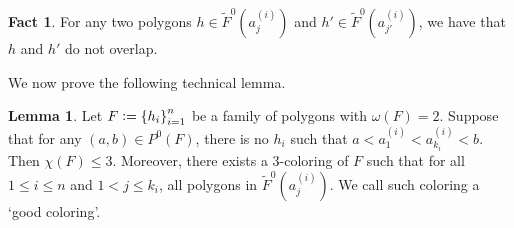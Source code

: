 \documentclass[12pt]{article}
\theoremstyle{definition}
\newtheorem{lemma}[thm]{Lemma}
\newtheorem{fact}[thm]{Fact}
\newcommand{\defeq}{\vcentcolon=}
\begin{document}
     \begin{fact}
         For any two polygons
         $h \in \widetilde{F}^{0}\left(a_{j}^{\left(i\right)}\right)$ 
         and 
         $h' \in \widetilde{F}^{0}\left(a_{j'}^{\left(i\right)}\right)$, 
         we have that $h$ and $h'$
         do not overlap.    
     \end{fact}

     We now prove the following
     technical lemma.

     \begin{lemma} \label{lemma:poly}
         Let $F \defeq \left\{h_{i}\right\}_{i =1}^{n}$ 
         be a family of polygons with
         $\omega\left(F\right) = 2$.
         Suppose that for any
         $\left(a, b\right) \in P^{0}\left(F\right)$,
         there is no $h_{i}$ such
         that $a < a_1^{\left(i\right)}
         < a_{k_{i}}^{\left(i\right)} < b$.
         Then $\chi\left(F\right) \leq 3$.
         Moreover, there exists
         a 3-coloring of $F$ such
         that for all $1 \leq i \leq n$
         and $1 < j \leq k_{i}$,
         all polygons in
         $\widetilde{F}^{0}\left(a_{j}^{\left(i\right)}\right)$.
         We call such coloring a
         `good coloring'.
     \end{lemma}
\end{document}
